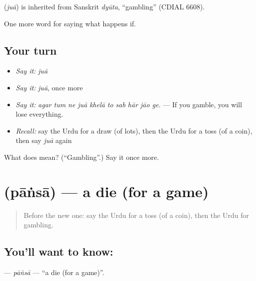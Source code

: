 \begin{cousinweb}
\textbf{} (\emph{juā}) is inherited from Sanskrit \emph{dyūta}, \textquotedblleft{}gambling\textquotedblright{} (CDIAL 6608).
\end{cousinweb}

\begin{grammarlens}[title={What you've built}]
One more word for saying what happens if.
\end{grammarlens}

\subsection*{Your turn}
\begin{itemize}
\raggedright
  \item \emph{Say it:} \emph{juā}
  \item \emph{Say it:} \emph{juā}, once more
  \item \emph{Say it:} \emph{agar tum ne juā khelā to sab hār jāo ge.} — If you gamble, you will lose everything.
  \item \emph{Recall:} say the Urdu for a draw (of lots), then the Urdu for a toss (of a coin), then say \emph{juā} again
\end{itemize}

\begin{tcolorbox}[breakable,colback=teal!4,colframe=teal!35!black,title={Before you move on}]
What does  mean? (\textquotedblleft{}Gambling\textquotedblright{}.) Say it once more.
\end{tcolorbox}
\section[\texorpdfstring{\ur{پانسہ} (pāṅsā)}{پانسہ (pāṅsā)}]{ (pāṅsā) — a die (for a game)}

\label{lesson:UR-C533-pansa}



\begin{quote}
Before the new one: say the Urdu for a toss (of a coin), then the Urdu for gambling.
\end{quote}

\subsection*{You'll want to know: }
\textbf{} — \emph{pāṅsā} — \textquotedblleft{}a die (for a game)\textquotedblright{}.

